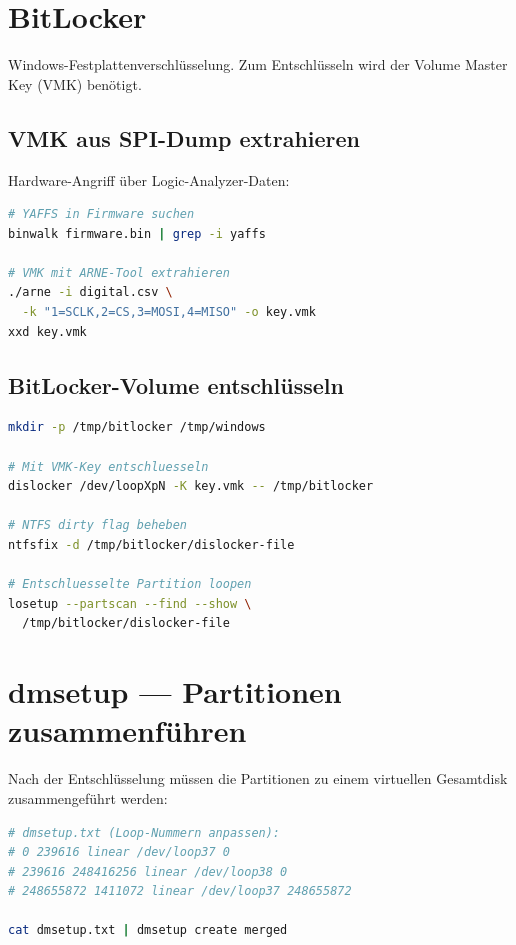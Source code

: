 \section{BitLocker}

Windows-Festplattenverschlüsselung.
Zum Entschlüsseln wird der Volume Master Key (VMK) benötigt.

\subsection{VMK aus SPI-Dump extrahieren}

Hardware-Angriff über Logic-Analyzer-Daten:

\begin{lstlisting}[language=bash]
# YAFFS in Firmware suchen
binwalk firmware.bin | grep -i yaffs

# VMK mit ARNE-Tool extrahieren
./arne -i digital.csv \
  -k "1=SCLK,2=CS,3=MOSI,4=MISO" -o key.vmk
xxd key.vmk
\end{lstlisting}

\subsection{BitLocker-Volume entschlüsseln}

\begin{lstlisting}[language=bash]
mkdir -p /tmp/bitlocker /tmp/windows

# Mit VMK-Key entschluesseln
dislocker /dev/loopXpN -K key.vmk -- /tmp/bitlocker

# NTFS dirty flag beheben
ntfsfix -d /tmp/bitlocker/dislocker-file

# Entschluesselte Partition loopen
losetup --partscan --find --show \
  /tmp/bitlocker/dislocker-file
\end{lstlisting}

\section{dmsetup — Partitionen zusammenführen}

Nach der Entschlüsselung müssen die Partitionen zu einem virtuellen Gesamtdisk zusammengeführt werden:

\begin{lstlisting}[language=bash]
# dmsetup.txt (Loop-Nummern anpassen):
# 0 239616 linear /dev/loop37 0
# 239616 248416256 linear /dev/loop38 0
# 248655872 1411072 linear /dev/loop37 248655872

cat dmsetup.txt | dmsetup create merged
\end{lstlisting}

